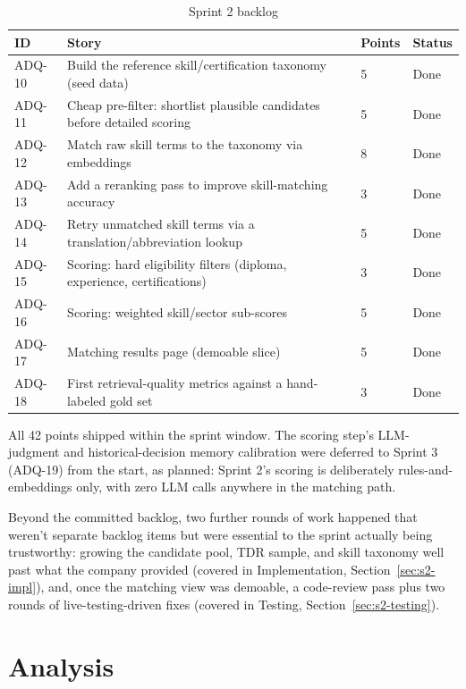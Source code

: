 \begin{table}[H]
  \centering
  \caption{Sprint 2 backlog}
  \label{tab:sprint2-backlog}
  \begin{tabular}{@{}p{1.7cm}p{11.2cm}p{1.3cm}p{2.7cm}@{}}
    \toprule
    ID & Story & Points & Status \\
    \midrule
    ADQ-10 & Build the reference skill/certification taxonomy (seed data) & 5 & Done \\
    ADQ-11 & Cheap pre-filter: shortlist plausible candidates before detailed scoring & 5 & Done \\
    ADQ-12 & Match raw skill terms to the taxonomy via embeddings & 8 & Done \\
    ADQ-13 & Add a reranking pass to improve skill-matching accuracy & 3 & Done \\
    ADQ-14 & Retry unmatched skill terms via a translation/abbreviation lookup & 5 & Done \\
    ADQ-15 & Scoring: hard eligibility filters (diploma, experience, certifications) & 3 & Done \\
    ADQ-16 & Scoring: weighted skill/sector sub-scores & 5 & Done \\
    ADQ-17 & Matching results page (demoable slice) & 5 & Done \\
    ADQ-18 & First retrieval-quality metrics against a hand-labeled gold set & 3 & Done \\
    \bottomrule
  \end{tabular}
\end{table}

All 42 points shipped within the sprint window. The scoring step's
LLM-judgment and historical-decision memory calibration were deferred to
Sprint 3 (ADQ-19) from the start, as planned: Sprint 2's scoring is
deliberately rules-and-embeddings only, with zero LLM calls anywhere in
the matching path.

Beyond the committed backlog, two further rounds of work happened that
weren't separate backlog items but were essential to the sprint actually
being trustworthy: growing the candidate pool, TDR sample, and skill
taxonomy well past what the company provided (covered in Implementation,
Section~\ref{sec:s2-impl}), and, once the matching view was demoable, a
code-review pass plus two rounds of live-testing-driven fixes (covered in
Testing, Section~\ref{sec:s2-testing}).

\section{Analysis}


